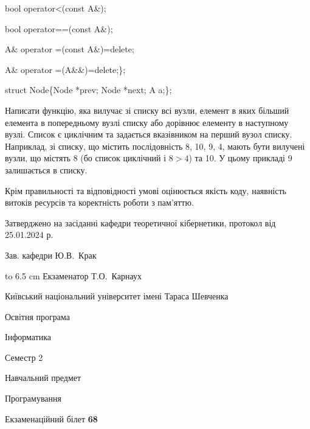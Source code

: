 \documentclass[12pt, ukrainian]{article}
\begin{document}
{\quad  bool operator<(const A\&); 

\quad  bool operator==(const A\&); 

\quad A\& operator =(const A\&)=delete; 

\quad  A\& operator =(A\&\&)=delete;\};

struct Node\{Node *prev; Node *next; A a;\};

Написати функцію, яка вилучає зі списку всі вузли, елемент в яких більший елемента в попередньому вузлі списку або дорівнює елементу в наступному вузлі. Список є циклічним та задається вказівником на перший вузол списку. Наприклад, зі списку, що містить послідовність 8, 10, 9, 4, мають бути вилучені вузли, що містять 8 (бо список циклічний і $8>4$) та 10. У цьому прикладі 9 залишається в списку.

Крім правильності та відповідності умові оцінюється якість коду, наявність витоків ресурсів та коректність роботи з пам'яттю. 

}
{\smallskip\smallskip \begin {scriptsize} Затверджено на засіданні кафедри теоретичної кібернетики, протокол   від   25.01.2024 р.\par\smallskip\smallskip\smallskip\smallskip
{\parbox {6.5 cm} {Зав. кафедри \dotfill Ю.В.~Крак}}\hspace {0.7cm} {\hbox to 6.5 cm { Екзаменатор \dotfill Т.О.~Карнаух}} \end{scriptsize}}
\newpage
{{\begin {scriptsize}\par
{ \center  Київський національний університет імені Тараса Шевченка \par}
{\parbox {5 cm}{Освітня програма \hfill}{\parbox {7 cm}{Інформатика\hfill}}\parbox {6 cm}{\hfill Семестр 2}}\par
{\parbox {5 cm} {Навчальний предмет \hfill}\parbox {7 cm}{Програмування \hfill}\parbox {6cm}{\hfill}\par}\vspace{-15pt} \end{scriptsize}}{\center Екзаменаційний білет \No \textbf { 68 }\par}}
\end{document}
